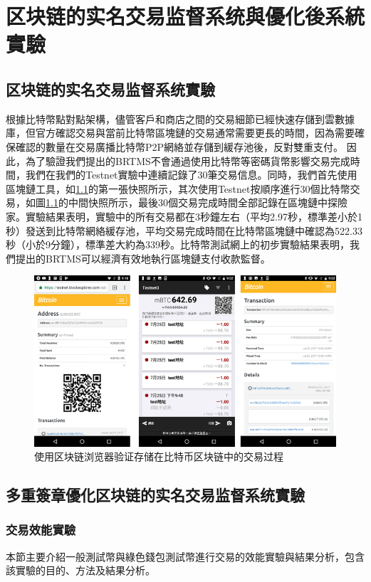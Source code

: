 
\chapter{区块链的实名交易监督系统與優化後系統實驗}
	\section{区块链的实名交易监督系统實驗}
	根據比特幣點對點架構，儘管客戶和商店之間的交易細節已經快速存儲到雲數據庫，但官方確認交易與當前比特幣區塊鏈的交易通常需要更長的時間，因為需要確保確認的數量在交易廣播比特幣P2P網絡並存儲到緩存池後，反對雙重支付。
	因此，為了驗證我們提出的BRTMS不會通過使用比特幣等密碼貨幣影響交易完成時間，我們在我們的Testnet實驗中連續記錄了30筆交易信息。同時，我們首先使用區塊鏈工具，如\ref{fig9}的第一張快照所示，其次使用Testnet按順序進行30個比特幣交易，如圖\ref{fig9}的中間快照所示，最後30個交易完成時間全部記錄在區塊鏈中探險家。實驗結果表明，實驗中的所有交易都在3秒鐘左右（平均2.97秒，標準差小於1秒）發送到比特幣網絡緩存池，平均交易完成時間在比特幣區塊鏈中確認為522.33秒（小於9分鐘），標準差大約為339秒。比特幣測試網上的初步實驗結果表明，我們提出的BRTMS可以經濟有效地執行區塊鏈支付收款監督。

	\begin{figure}[h]
		\centering
		\includegraphics[width = 1\textwidth]{fig9.png}
		\caption{使用区块链浏览器验证存储在比特币区块链中的交易过程}\label{fig9}
	\end{figure}

	\section{多重簽章優化区块链的实名交易监督系统實驗}
		\subsection{交易效能實驗}
		本節主要介紹一般測試幣與綠色錢包測試幣進行交易的效能實驗與結果分析，包含該實驗的目的、方法及結果分析。

